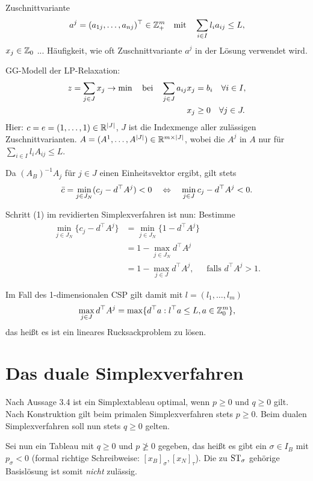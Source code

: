 Zuschnittvariante
\[ a^j = (a_{1j}, \ldots, a_{nj})^\top \in \mathbb{Z}^m_+ \quad \text{mit} \quad
  \sum_{i \in I} l_i a_{ij} \le L, \]
$x_j \in \mathbb{Z}_0$ ... Häufigkeit, wie oft Zuschnittvariante $a^j$ in der
Lösung verwendet wird.

GG-Modell der LP-Relaxation:
\[ \begin{aligned}
    z = \sum_{j \in J} x_j \to \min \quad \text{bei} \quad
    \sum_{j \in J} a_{ij} x_j &= b_i  \quad \forall i \in I, \\
    x_j &\ge 0 \quad \forall j \in J.
  \end{aligned}
\]
Hier: $c = e = (1, \ldots, 1) \in \mathbb{R}^{|J|}$, $J$ ist die Indexmenge aller
zulässigen Zuschnittvarianten. $A = (A^1, \ldots, A^{|J|}) \in
\mathbb{R}^{m \times |J|}$, wobei die $A^j$ in $A$ nur für $\sum_{i \in I} l_i A_{ij} \le
L$. 

Da $(A_B)^{-1} A_j$ für $j \in J$ einen Einheitsvektor ergibt, gilt stets
\[ \bar{c} = \min_{j \in J_N} (c_j - d^\top A^j) < 0 \quad \Leftrightarrow \quad 
  \min_{j \in J} c_j - d^\top A^j < 0. \]

Schritt (1) im revidierten Simplexverfahren ist nun: Bestimme
\[ \begin{aligned}
    \min_{j \in J_N} \{ c_j - d^\top A^j \} 
    &= \min_{j \in J_N} \{ 1 - d^\top A^j \} \\
    &= 1 - \max_{j \in J_N} d^\top A^j \\
    &= 1 - \max_{j \in J} d^\top A^j, & \text{falls } d^\top A^j > 1.
  \end{aligned} \]

Im Fall des 1-dimensionalen CSP gilt damit mit $l = (l_1, \ldots, l_m)$
\[ \max_{j \in J} d^\top A^j = \max \{ d^\top a : l^\top a \le L, a \in
  \mathbb{Z}_0^m \}, \]
das heißt es ist ein lineares Rucksackproblem zu lösen.

\section{Das duale Simplexverfahren}
Nach  Aussage 3.4 ist ein Simplextableau optimal, wenn $p \ge 0$ und $q \ge 0$
gilt. Nach Konstruktion gilt beim primalen Simplexverfahren stets $p \ge 0$.
Beim dualen Simplexverfahren soll nun stets $q \ge 0$ gelten.

Sei nun ein Tableau mit $q \ge 0$ und $p \ngeq 0$ gegeben, das heißt es gibt ein
$\sigma \in I_B$ mit $p_\sigma < 0$ (formal richtige Schreibweise:
$[x_B]_\sigma, [x_N]_\tau$). Die zu $\operatorname*{ST}_\sigma$ gehörige Basislösung ist
somit \emph{nicht} zulässig.

